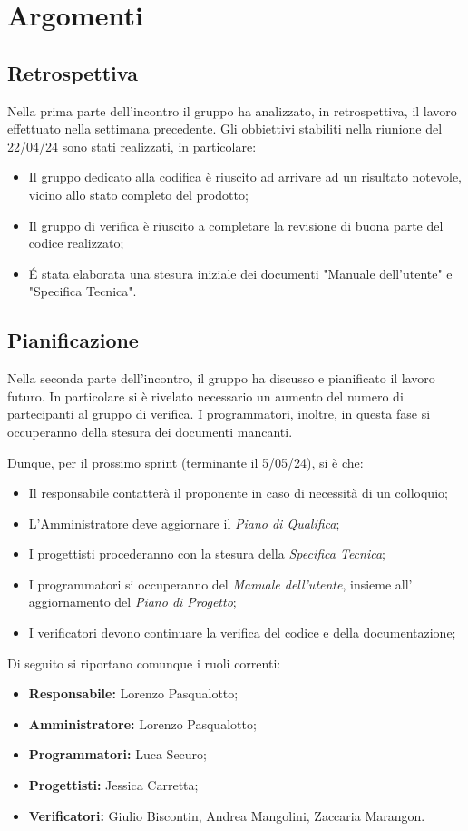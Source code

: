 \section{Argomenti}
\subsection{Retrospettiva}
Nella prima parte dell'incontro il gruppo ha analizzato, in retrospettiva, il lavoro effettuato nella settimana precedente.
Gli obbiettivi stabiliti nella riunione del 22/04/24 sono stati realizzati, in particolare:
\begin{itemize}
    \item Il gruppo dedicato alla codifica è riuscito ad arrivare ad un risultato notevole, vicino allo stato completo del prodotto;
    \item Il gruppo di verifica è riuscito a completare la revisione di buona parte del codice realizzato;
    \item  É stata elaborata una stesura iniziale dei documenti "Manuale dell'utente" e "Specifica Tecnica".
\end{itemize}



\subsection{Pianificazione}
\noindent Nella seconda parte dell'incontro, il gruppo ha discusso e pianificato il lavoro futuro. In particolare si è rivelato necessario un aumento del numero di partecipanti al gruppo di verifica. I programmatori, inoltre, in questa fase si occuperanno della stesura dei documenti mancanti.
\bigskip

\noindent Dunque, per il prossimo sprint (terminante il 5/05/24), si è che:
\begin{itemize}
    \item Il responsabile contatterà il proponente in caso di necessità di un colloquio;
    \item L'Amministratore deve aggiornare il  \textit{Piano di Qualifica};
    \item I progettisti procederanno con la stesura della \textit{Specifica Tecnica};
    \item I programmatori si occuperanno del \textit{Manuale dell'utente}, insieme all' aggiornamento del \textit{Piano di Progetto};
    \item I verificatori devono continuare la verifica del codice e della documentazione;
\end{itemize}
\bigskip

Di seguito si riportano comunque i ruoli correnti:
\begin{itemize}
    \item \textbf{Responsabile:} Lorenzo Pasqualotto;
    \item \textbf{Amministratore:} Lorenzo Pasqualotto;
    \item \textbf{Programmatori:} Luca Securo;
    \item \textbf{Progettisti:} Jessica Carretta;
    \item \textbf{Verificatori:} Giulio Biscontin, Andrea Mangolini, Zaccaria Marangon.
\end{itemize}